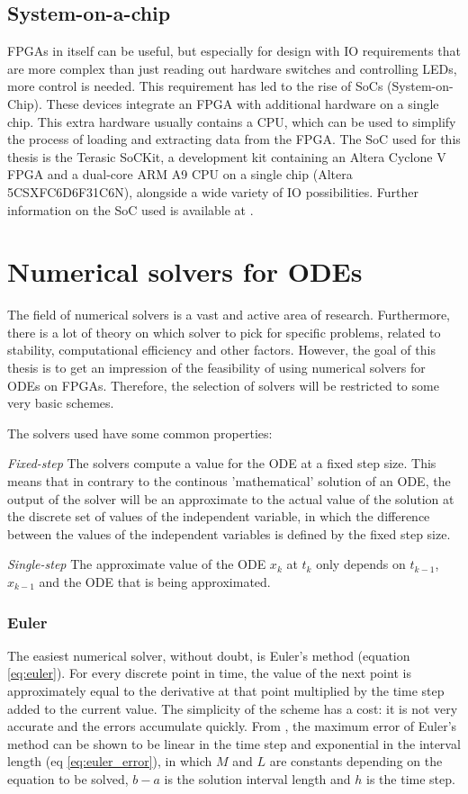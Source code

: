 \subsection{System-on-a-chip}
FPGAs in itself can be useful, but especially for design with IO requirements that are more complex than just reading out hardware switches and controlling LEDs, more control is needed. This requirement has led to the rise of SoCs (System-on-Chip). These devices integrate an FPGA with additional hardware on a single chip. This extra hardware usually contains a CPU, which can be used to simplify the process of loading and extracting data from the FPGA. The SoC used for this thesis is the Terasic SoCKit, a development kit containing an Altera Cyclone V FPGA and a dual-core ARM A9 CPU on a single chip (Altera 5CSXFC6D6F31C6N), alongside a wide variety of IO possibilities. Further information on the SoC used is available at \cite{SoCKit}.

\section{Numerical solvers for ODEs}
The field of numerical solvers is a vast and active area of research. Furthermore, there is a lot of theory on which solver to pick for specific problems, related to stability, computational efficiency and other factors. However, the goal of this thesis is to get an impression of the feasibility of using numerical solvers for ODEs on FPGAs. Therefore, the selection of solvers will be restricted to some very basic schemes. 

The solvers used have some common properties:
\begin{itemizens}
	\item \emph{Fixed-step} The solvers compute a value for the ODE at a fixed step size. This means that in contrary to the continous 'mathematical' solution of an ODE, the output of the solver will be an approximate to the actual value of the solution at the discrete set of values of the independent variable, in which the difference between the values of the independent variables is defined by the fixed step size.
	\item \emph{Single-step} The approximate value of the ODE $x_{k}$ at $t_{k}$ only depends on $t_{k-1}$, $x_{k-1}$ and the ODE that is being approximated.   
\end{itemizens}

\subsubsection{Euler}
The easiest numerical solver, without doubt, is Euler's method (equation \ref{eq:euler}). For every discrete point in time, the value of the next point is approximately equal to the derivative at that point multiplied by the time step added to the current value. The simplicity of the scheme has a cost: it is not very accurate and the errors accumulate quickly. From \cite{DE}, the maximum error of Euler's method can be shown to be linear in the time step and exponential in the interval length (eq \ref{eq:euler_error}), in which $M$ and $L$ are constants depending on the equation to be solved, $b-a$ is the solution interval length and $h$ is the time step.


